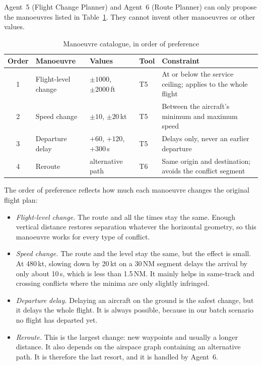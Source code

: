 Agent~5 (Flight Change Planner) and Agent~6 (Route Planner) can only propose the manoeuvres listed in Table~\ref{tab:manoeuvres}. They cannot invent other manoeuvres or other values.

\begin{table}[H]
\centering
\caption{Manoeuvre catalogue, in order of preference}
\label{tab:manoeuvres}
\small
\begin{tabularx}{\linewidth}{@{}c l l l >{\raggedright\arraybackslash}X@{}}
\toprule
\textbf{Order} & \textbf{Manoeuvre} & \textbf{Values} & \textbf{Tool} & \textbf{Constraint} \\
\midrule
1 & Flight-level change & $\pm 1000$, $\pm 2000$\,ft & T5 & At or below the service ceiling; applies to the whole flight \\
2 & Speed change        & $\pm 10$, $\pm 20$\,kt      & T5 & Between the aircraft's minimum and maximum speed \\
3 & Departure delay     & $+60$, $+120$, $+300$\,s    & T5 & Delays only, never an earlier departure \\
4 & Reroute             & alternative path            & T6 & Same origin and destination; avoids the conflict segment \\
\bottomrule
\end{tabularx}
\end{table}

The order of preference reflects how much each manoeuvre changes the original flight plan:
\begin{itemize}
    \item \emph{Flight-level change.} The route and all the times stay the same. Enough vertical distance restores separation whatever the horizontal geometry, so this manoeuvre works for every type of conflict.
    \item \emph{Speed change.} The route and the level stay the same, but the effect is small. At 480\,kt, slowing down by 20\,kt on a 30\,NM segment delays the arrival by only about 10\,s, which is less than 1.5\,NM. It mainly helps in same-track and crossing conflicts where the minima are only slightly infringed.
    \item \emph{Departure delay.} Delaying an aircraft on the ground is the safest change, but it delays the whole flight. It is always possible, because in our batch scenario no flight has departed yet.
    \item \emph{Reroute.} This is the largest change: new waypoints and usually a longer distance. It also depends on the airspace graph containing an alternative path. It is therefore the last resort, and it is handled by Agent~6.
\end{itemize}

